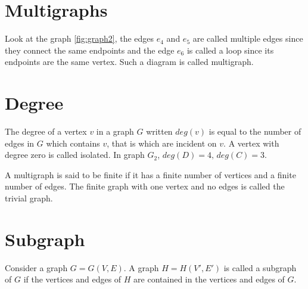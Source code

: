 \documentclass[12pt,oneside,a4paper]{book}
\theoremstyle{remark}
\theoremstyle{definition}
\begin{document}
\section{Multigraphs} 
Look at the graph \ref{fig:graph2}, the edges $ e_4 $ and $ e_5 $ are called multiple edges since they connect the same endpoints and the edge $ e_6 $ is called a loop since its endpoints are the same vertex. Such a diagram is called multigraph.
\section{Degree}
The degree of a vertex $ v $ in a graph $ G $ written $ deg(v) $ is equal to the number of edges in $ G $ which contains $ v $, that is which are incident on $ v $. A vertex with degree zero is called isolated. In graph $ G_2 $, $ deg(D)=4,\,deg(C)=3 $.

A multigraph is said to be finite if it has a finite number of vertices and a finite number of edges. The finite graph with one vertex and no edges is called the trivial graph.
\section{Subgraph}
Consider a graph $ G=G(V,E) $. A graph $ H=H(V',E') $ is called a subgraph of $ G $ if the vertices and edges of $ H $ are contained in the vertices and edges of $ G $.
\end{document}
